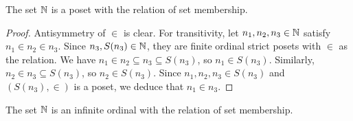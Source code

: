 \begin{lemma} \label{naturals-form-a-poset}
    The set $\operatorname{\mathbb N}$ is a poset with the relation of set membership.
\end{lemma}

\begin{proof}
    Antisymmetry of $\in$ is clear. For transitivity, let $n_1, n_2, n_3 \in \operatorname{\mathbb N}$ satisfy $n_1 \in n_2 \in n_3$. Since $n_3, S(n_3) \in \operatorname{\mathbb N}$, they are finite ordinal strict posets with $\in$ as the relation. We have $n_1 \in n_2 \subseteq n_3 \subseteq S(n_3)$, so $n_1 \in S(n_3)$. Similarly, $n_2 \in n_3 \subseteq S(n_3)$, so $n_2 \in S(n_3)$. Since $n_1, n_2, n_3 \in S(n_3)$ and $(S(n_3), \in)$ is a poset, we deduce that $n_1 \in n_3$. 
\end{proof}

\begin{theorem} \label{well-ordering-of-the-naturals}
    The set $\operatorname{\mathbb N}$ is an infinite ordinal with the relation of set membership.
\end{theorem}

